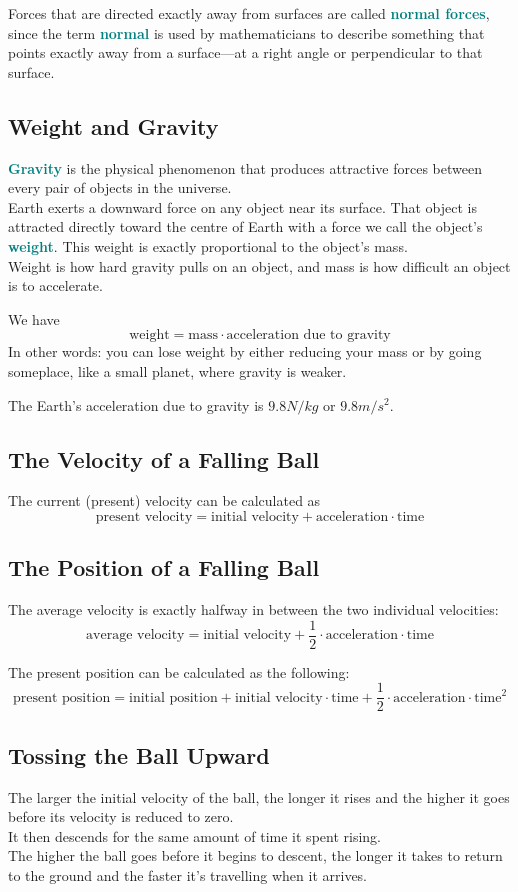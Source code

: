 \documentclass[12pt]{article}
\theoremstyle{definition}
\newcommand{\defnterm}[1]{\textbf{\textcolor{teal}{#1}}\index{#1}}
\begin{document}
Forces that are directed exactly away from surfaces are called \defnterm{normal forces}, since the term \defnterm{normal} is used by mathematicians to describe something that points exactly away from a surface---at a right angle or perpendicular to that surface.

\subsection{Weight and Gravity}
\defnterm{Gravity} is the physical phenomenon that produces attractive forces between every pair of objects in the universe. \\

Earth exerts a downward force on any object near its surface.
That object is attracted directly toward the centre of Earth with a force we call the object's \defnterm{weight}.
This weight is exactly proportional to the object's mass. \\
Weight is how hard gravity pulls on an object, and mass is how difficult an object is to accelerate.

We have
$$\text{weight} = \text{mass} \cdot \text{acceleration due to gravity}$$
In other words: you can lose weight by either reducing your mass or by going someplace, like a small planet, where gravity is weaker.

The Earth's acceleration due to gravity is $9.8N/kg$ or $9.8m/s^{2}$.

\subsection{The Velocity of a Falling Ball}
The current (present) velocity can be calculated as
$$\text{present velocity} = \text{initial velocity} + \text{acceleration} \cdot \text{time}$$

\subsection{The Position of a Falling Ball}
The average velocity is exactly halfway in between the two individual velocities:
$$\text{average velocity} = \text{initial velocity} + \frac{1}{2}\cdot\text{acceleration}\cdot\text{time}$$

The present position can be calculated as the following:
$$\text{present position} = \text{initial position} + \text{initial velocity}\cdot\text{time} + \frac{1}{2}\cdot\text{acceleration}\cdot\text{time}^{2}$$

\subsection{Tossing the Ball Upward}
The larger the initial velocity of the ball, the longer it rises and the higher it goes before its velocity is reduced to zero. \\
It then descends for the same amount of time it spent rising. \\
The higher the ball goes before it begins to descent, the longer it takes to return to the ground and the faster it's travelling when it arrives.
\end{document}
